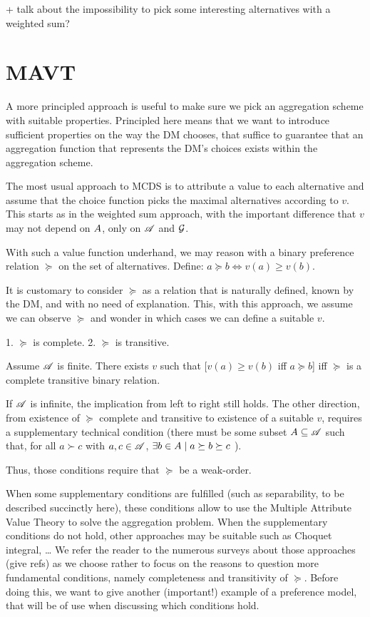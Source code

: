 \documentclass[french, english]{llncs}
\begin{document}
+ talk about the impossibility to pick some interesting alternatives with a weighted sum?

\section{MAVT}
A more principled approach is useful to make sure we pick an aggregation scheme with suitable properties. Principled here means that we want to introduce sufficient properties on the way the \ac{DM} chooses, that suffice to guarantee that an aggregation function that represents the \ac{DM}’s choices exists within the aggregation scheme.

The most usual approach to MCDS is to attribute a value to each alternative and assume that the choice function picks the maximal alternatives according to $v$. This starts as in the weighted sum approach, with the important difference that $v$ may not depend on $A$, only on $\mathscr{A}$ and $\mathcal{G}$.

With such a value function underhand, we may reason with a binary preference relation $\succeq$ on the set of alternatives. Define: $a \succeq b ⇔ v(a) ≥ v(b)$.

It is customary to consider $\succeq$ as a relation that is naturally defined, known by the \ac{DM}, and with no need of explanation. This, with this approach, we assume we can observe $\succeq$ and wonder in which cases we can define a suitable $v$.

1. $\succeq$ is complete.
2. $\succeq$ is transitive.

\begin{theorem}
	Assume $\mathscr{A}$ is finite. There exists $v$ such that [$v(a) ≥ v(b)$ iff $a \succeq b$] iff $\succeq$ is a complete transitive binary relation.
\end{theorem}
If $\mathscr{A}$ is infinite, the implication from left to right still holds. The other direction, from existence of $\succeq$ complete and transitive to existence of a suitable $v$, requires a supplementary technical condition (there must be some subset $A \subseteq \mathscr{A}$ such that, for all $a \succ c$ with $a, c \in \mathscr{A}$, $\exists b \in \alts \suchthat a \succeq b \succeq c$ \citep[Ch. 2, Th. 2, p. 40]{krantz_foundations_1971}). 

Thus, those conditions require that $\succeq$ be a weak-order. 

When some supplementary conditions are fulfilled (such as separability, to be described succinctly here), these conditions allow to use the Multiple Attribute Value Theory to solve the aggregation problem. When the supplementary conditions do not hold, other approaches may be suitable such as Choquet integral, … We refer the reader to the numerous surveys about those approaches (give refs) as we choose rather to focus on the reasons to question more fundamental conditions, namely completeness and transitivity of $\succeq$. Before doing this, we want to give another (important!) example of a preference model, that will be of use when discussing which conditions hold.
\end{document}
